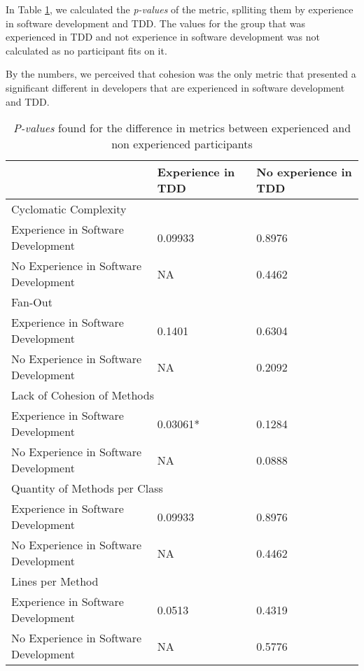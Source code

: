 \documentclass[conference]{IEEEtran}
\begin{document}
In Table \ref{valores-separados}, we calculated the \textit{p-values} of the metric,
splliting them by experience in software development and TDD. The values for the group that
was experienced in TDD and not experience in software development was not calculated as no
participant fits on it.

By the numbers, we perceived that cohesion was the only metric that presented a significant
different in developers that are experienced in software development and TDD.

\begin{table}
	\centering
	\begin{tabular}{ | p{3cm} | p{2cm} | p{2cm} | }
		\hline
		  & \textbf{Experience in TDD} & \textbf{No experience in TDD} \\
		\hline
			\multicolumn{3}{|l|}{Cyclomatic Complexity} \\
		\hline
			Experience in Software Development 		& 0.09933	&	0.8976\\
			\hline
			No Experience in Software Development 	& NA		&	0.4462\\
		\hline
			\multicolumn{3}{|l|}{Fan-Out}\\
		\hline
			Experience in Software Development 		& 0.1401	&	0.6304\\
			\hline
			No Experience in Software Development 	& NA		&	0.2092\\
		\hline
			\multicolumn{3}{|l|}{Lack of Cohesion of Methods}\\
		\hline
			Experience in Software Development 		& \cellcolor[gray]{0.8}0.03061*	&	0.1284\\
			\hline
			No Experience in Software Development 	& NA		&	0.0888\\
		\hline
			\multicolumn{3}{|l|}{Quantity of Methods per Class} \\
		\hline
			Experience in Software Development 		& 0.09933	&	0.8976\\
			\hline
			No Experience in Software Development 	& NA		&	0.4462\\
		\hline
			\multicolumn{3}{|l|}{Lines per Method}\\
		\hline
			Experience in Software Development 		& 0.0513	&	0.4319\\
			\hline
			No Experience in Software Development 	& NA		&	0.5776\\
		\hline
	\end{tabular}
	\caption{\textit{P-values} found for the difference in metrics between experienced and non experienced participants}
	\label{valores-separados}
\end{table}
\end{document}
